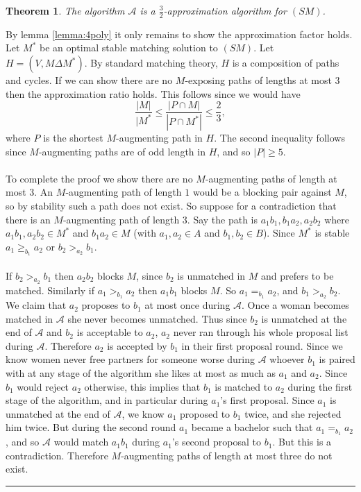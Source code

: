 \documentclass[letterpaper,12pt,oneside,onecolumn]{article}
\newcommand{\cA}{\mathcal{A}} \newcommand{\cB}{\mathcal{B}}
\newenvironment{proof}{{\bf Proof:  }}{\hfill\rule{2mm}{2mm}}
\newtheorem{theorem}[fact]{Theorem}
\begin{document}
\begin{theorem}
The algorithm $\cA$ is a $\frac{3}{2}$-approximation algorithm for $(SM)$.
\end{theorem}
\begin{proof}
By lemma \ref{lemma:4poly} it only remains to show the approximation factor holds. Let $M^*$ be an optimal stable matching solution to $(SM)$. Let $H = (V, M \Delta M^*)$. By standard matching theory, $H$ is a composition of paths and cycles. If we can show there are no $M$-exposing paths of lengths at most $3$ then the approximation ratio holds. This follows since we would have $$\frac{|M|}{|M^*} \leq \frac{|P \cap M|}{|P\cap M^*|} \leq \frac{2}{3},$$
where $P$ is the shortest $M$-augmenting path in $H$. The second inequality follows since $M$-augmenting paths are of odd length in $H$, and so $|P| \geq 5$.
\paragraph{}
To complete the proof we show there are no $M$-augmenting paths of length at most $3$. An $M$-augmenting path of length $1$ would be a blocking pair against $M$, so by stability such a path does not exist. So suppose for a contradiction that there is an $M$-augmenting path of length $3$. Say the path is $a_1b_1, b_1a_2,a_2b_2$ where $a_1b_1,a_2b_2 \in M^*$ and $b_1a_2 \in M$ (with $a_1,a_2 \in A$ and $b_1,b_2 \in B$). Since $M^*$ is stable $a_1 \geq_{b_1} a_2$ or $b_2 >_{a_2} b_1$.
\paragraph{}
If $b_2 >_{a_2} b_1$ then $a_2b_2$ blocks $M$, since $b_2$ is unmatched in $M$ and prefers to be matched. Similarly if $a_1 >_{b_1} a_2$ then $a_1b_1$ blocks $M$. So $a_1 =_{b_1} a_2$, and $b_1 >_{a_2} b_2$. We claim that $a_2$ proposes to $b_1$ at most once during $\cA$. Once a woman becomes matched in $\cA$ she never becomes unmatched. Thus since $b_2$ is unmatched at the end of $\cA$ and $b_2$ is acceptable to $a_2$, $a_2$ never ran through his whole proposal list during $\cA$. Therefore $a_2$ is accepted by $b_1$ in their first proposal round. Since we know women never free partners for someone worse during $\cA$ whoever $b_1$ is paired with at any stage of the algorithm she likes at most as much as $a_1$ and $a_2$. Since $b_1$ would reject $a_2$ otherwise, this implies that $b_1$ is matched to $a_2$ during the first stage of the algorithm, and in particular during $a_1$'s first proposal. Since $a_1$ is unmatched at the end of $\cA$, we know $a_1$ proposed to $b_1$ twice, and she rejected him twice. But during the second round $a_1$ became a bachelor such that $a_1 =_{b_1} a_2$, and so $\cA$ would match $a_1b_1$ during $a_1$'s second proposal to $b_1$. But this is a contradiction. Therefore $M$-augmenting paths of length at most three do not exist.
\end{proof}
\end{document}
